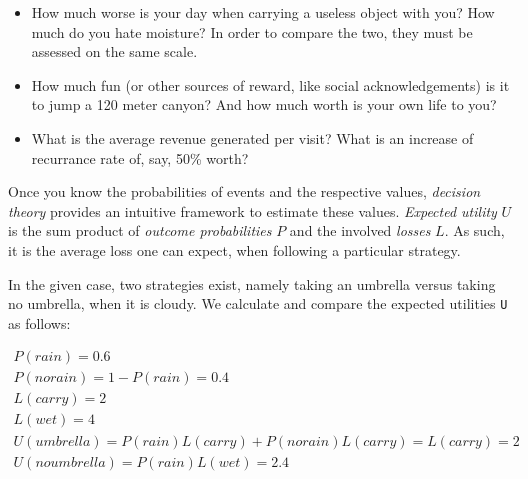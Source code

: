 \documentclass[]{svmono}
\providecommand{\tightlist}{%
  \setlength{\itemsep}{0pt}\setlength{\parskip}{0pt}}
\begin{document}
\begin{itemize}
\tightlist
\item
  How much worse is your day when carrying a useless object with you?
  How much do you hate moisture? In order to compare the two, they must
  be assessed on the same scale.
\item
  How much fun (or other sources of reward, like social
  acknowledgements) is it to jump a 120 meter canyon? And how much worth
  is your own life to you?
\item
  What is the average revenue generated per visit? What is an increase
  of recurrance rate of, say, 50\% worth?
\end{itemize}

Once you know the probabilities of events and the respective values,
\emph{decision theory} provides an intuitive framework to estimate these
values. \emph{Expected utility} \(U\) is the sum product of
\emph{outcome probabilities} \(P\) and the involved \emph{losses} \(L\).
As such, it is the average loss one can expect, when following a
particular strategy.

In the given case, two strategies exist, namely taking an umbrella
versus taking no umbrella, when it is cloudy. We calculate and compare
the expected utilities \texttt{U} as follows:

\[\begin{aligned}
P(rain) = 0.6 \\
P(no rain) = 1 - P(rain) = 0.4 \\
L(carry) = 2 \\
L(wet) = 4 \\
U(umbrella) = P(rain) L(carry) + P(no rain) L(carry)  = L(carry) = 2\\
U(no umbrella) = P(rain) L(wet) = 2.4
\end{aligned}
\]
\end{document}
